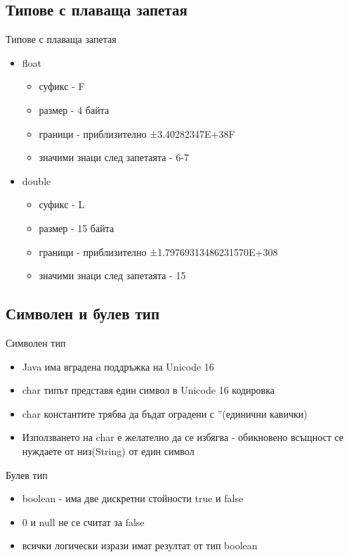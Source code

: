 \documentclass{beamer}
\begin{document}
\subsection{Типове с плаваща запетая}
\begin{frame}{Типове с плаваща запетая}
  \transdissolve
  \begin{itemize}
  \item float
    \begin{itemize}
    \item суфикс - F
    \item размер - 4 байта
    \item граници - приблизително ±3.40282347E+38F
    \item значими знаци след запетаята - 6-7
    \end{itemize} \pause
    \item double
      \begin{itemize}
      \item суфикс - L
      \item размер - 15 байта
      \item граници - приблизително ±1.79769313486231570E+308
      \item значими знаци след запетаята - 15
      \end{itemize}
  \end{itemize}
\end{frame}

\subsection{Символен и булев тип}
\begin{frame}{Символен тип}
  \transdissolve
  \begin{itemize}
  \item Java има вградена поддръжка на Unicode 16 \pause
  \item char типът представя един символ в Unicode 16 кодировка \pause
  \item char константите трябва да бъдат оградени с ''(единични
    кавички) \pause
  \item Използването на char е желателно да се избягва - обикновено
    всъщност се нуждаете от низ(String) от един символ \pause
  \end{itemize}
\end{frame}

\begin{frame}{Булев тип}
  \transdissolve
  \begin{itemize}
  \item boolean - има две дискретни стойности true и false \pause
  \item 0 и null не се считат за false \pause
  \item всички логически изрази имат резултат от тип boolean \pause
  \end{itemize}
\end{frame}
\end{document}
